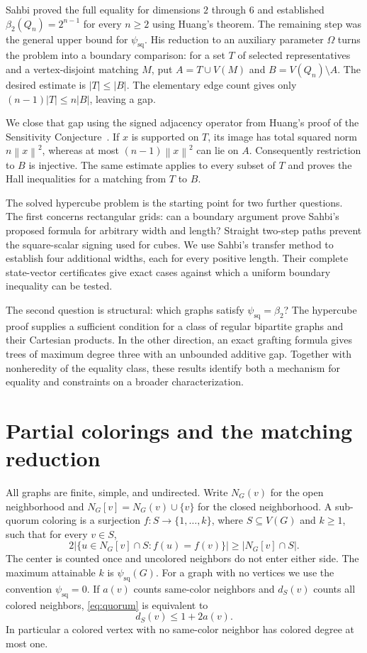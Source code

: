 \documentclass[11pt]{article}
\theoremstyle{definition}
\theoremstyle{remark}
\newcommand{\psq}{\psi_{\mathrm{sq}}}
\newcommand{\bii}{\beta_2}
\newcommand{\Om}{\Omega}
\newcommand{\norm}[1]{\left\lVert#1\right\rVert}
\begin{document}
Sahbi proved the full equality for dimensions $2$ through $6$ and established
$\bii(Q_n)=2^{n-1}$ for every $n\ge2$ using Huang's theorem.
The remaining step was the general upper bound for $\psq$. His reduction to an auxiliary
parameter $\Om$ turns the problem into a boundary comparison: for a set
$T$ of selected representatives and a vertex-disjoint matching $M$, put
$A=T\cup V(M)$ and $B=V(Q_n)\setminus A$. The desired estimate is
$|T|\le |B|$. The elementary edge count gives only
$(n-1)|T|\le n|B|$, leaving a gap.

We close that gap using the signed adjacency operator from Huang's proof
of the Sensitivity Conjecture~\cite{Huang}. If $x$ is supported on $T$, its
image has total squared norm $n\norm{x}^2$, whereas at most
$(n-1)\norm{x}^2$ can lie on $A$. Consequently restriction to $B$ is
injective. The same estimate applies to every subset of $T$ and proves the
Hall inequalities for a matching from $T$ to $B$.

The solved hypercube problem is the starting point for two further
questions. The first concerns rectangular grids: can a boundary argument
prove Sahbi's proposed formula for arbitrary width and length? Straight
two-step paths prevent the square-scalar signing used for cubes. We use
Sahbi's transfer method to establish four additional widths, each for
every positive length. Their complete state-vector certificates give
exact cases against which a uniform boundary inequality can be tested.

The second question is structural: which graphs satisfy $\psq=\bii$?
The hypercube proof supplies a sufficient condition for a class of
regular bipartite graphs and their Cartesian products. In the other
direction, an exact grafting formula gives trees of maximum degree three
with an unbounded additive gap. Together with nonheredity of the equality
class, these results identify both a mechanism for equality and constraints
on a broader characterization.

\section{Partial colorings and the matching reduction}\label{sec:reduction}

All graphs are finite, simple, and undirected. Write $N_G(v)$ for the open
neighborhood and $N_G[v]=N_G(v)\cup\{v\}$ for the closed neighborhood.
A sub-quorum coloring is a surjection $f:S\to\{1,\ldots,k\}$, where
$S\subseteq V(G)$ and $k\ge1$, such that for every $v\in S$,
\begin{equation}\label{eq:quorum}
 2\bigl|\{u\in N_G[v]\cap S:f(u)=f(v)\}\bigr|
 \ge |N_G[v]\cap S|.
\end{equation}
The center is counted once and uncolored neighbors do not enter either
side. The maximum attainable $k$ is $\psq(G)$. For a graph with no vertices we use
the convention $\psq=0$. If $a(v)$ counts same-color neighbors and $d_S(v)$
counts all colored neighbors, \eqref{eq:quorum} is equivalent to
\begin{equation}\label{eq:local}
 d_S(v)\le 1+2a(v).
\end{equation}
In particular a colored vertex with no same-color neighbor has colored
degree at most one.
\end{document}
